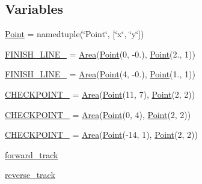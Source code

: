 \subsection*{Variables}
\begin{DoxyCompactItemize}
\item 
\hyperlink{namespacelap__timer_ab2bec4f9ed798440bcc6e438d5c76ff0}{Point} = namedtuple(\char`\"{}Point\char`\"{}, \mbox{[}\char`\"{}x\char`\"{}, \char`\"{}y\char`\"{}\mbox{]})
\item 
\hyperlink{namespacelap__timer_abcf675d3a6e4891c7c51cc9be2073d0c}{F\+I\+N\+I\+S\+H\+\_\+\+L\+I\+N\+E\+\_} = \hyperlink{classlap__timer_1_1_area}{Area}(\hyperlink{namespacelap__timer_ab2bec4f9ed798440bcc6e438d5c76ff0}{Point}(0, -\/0.), \hyperlink{namespacelap__timer_ab2bec4f9ed798440bcc6e438d5c76ff0}{Point}(2., 1))
\item 
\hyperlink{namespacelap__timer_ad3a94ca9d0504a76fc39eea4365804ad}{F\+I\+N\+I\+S\+H\+\_\+\+L\+I\+N\+E\+\_} = \hyperlink{classlap__timer_1_1_area}{Area}(\hyperlink{namespacelap__timer_ab2bec4f9ed798440bcc6e438d5c76ff0}{Point}(4, -\/0.), \hyperlink{namespacelap__timer_ab2bec4f9ed798440bcc6e438d5c76ff0}{Point}(1., 1))
\item 
\hyperlink{namespacelap__timer_a7d4aff4d1c24ecd19c02265c9dfa0a6f}{C\+H\+E\+C\+K\+P\+O\+I\+N\+T\+\_} = \hyperlink{classlap__timer_1_1_area}{Area}(\hyperlink{namespacelap__timer_ab2bec4f9ed798440bcc6e438d5c76ff0}{Point}(11, 7), \hyperlink{namespacelap__timer_ab2bec4f9ed798440bcc6e438d5c76ff0}{Point}(2, 2))
\item 
\hyperlink{namespacelap__timer_a33e41bd5d29fc940e87ee99b1aea26cd}{C\+H\+E\+C\+K\+P\+O\+I\+N\+T\+\_} = \hyperlink{classlap__timer_1_1_area}{Area}(\hyperlink{namespacelap__timer_ab2bec4f9ed798440bcc6e438d5c76ff0}{Point}(0, 4), \hyperlink{namespacelap__timer_ab2bec4f9ed798440bcc6e438d5c76ff0}{Point}(2, 2))
\item 
\hyperlink{namespacelap__timer_afbd7eeced4ee639b3f423fe8a2958410}{C\+H\+E\+C\+K\+P\+O\+I\+N\+T\+\_} = \hyperlink{classlap__timer_1_1_area}{Area}(\hyperlink{namespacelap__timer_ab2bec4f9ed798440bcc6e438d5c76ff0}{Point}(-\/14, 1), \hyperlink{namespacelap__timer_ab2bec4f9ed798440bcc6e438d5c76ff0}{Point}(2, 2))
\item 
\hyperlink{namespacelap__timer_a19f5402010a03485a8d1d178fffd77bb}{forward\+\_\+track}
\item 
\hyperlink{namespacelap__timer_a3df13cfdd738f0a1de56fab6cc242c40}{reverse\+\_\+track}
\end{DoxyCompactItemize}


